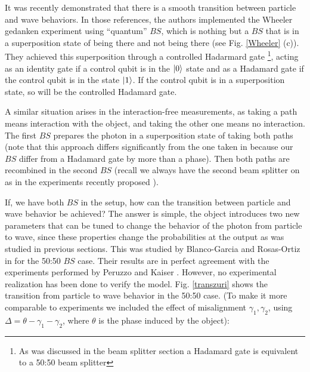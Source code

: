 \documentclass[12pt]{book}
\begin{document}
It was recently demonstrated \cite{Peruzzo, Kaiser2012} that there is a smooth transition between particle and wave behaviors. In those references, the authors implemented the Wheeler gedanken experiment using ``quantum'' $BS$, which is nothing but a $BS$ that is in a superposition state of being there and not being there (see Fig. \ref{Wheeler} (c)). They achieved this superposition through a controlled Hadarmard gate \footnote{As was discussed in the beam splitter section a Hadamard gate is equivalent to a 50:50 beam splitter}, acting as an identity gate if a control qubit is in the $\ket{0}$ state and as a Hadamard gate if the control qubit is in the state $\ket{1}$.  If the control qubit is in a superposition state, so will be the controlled Hadamard gate.




A similar situation arises in the interaction-free measurements, as taking a path means interaction with the object, and taking the other one means no interaction. The first $BS$ prepares the photon in a superposition state of taking both paths (note that this approach differs significantly from the one taken in \cite{Peruzzo,Kaiser2012} because our $BS$ differ from a Hadamard gate by more than a phase). Then both paths are recombined in the second $BS$ (recall we always have the second beam splitter on as in the experiments recently proposed \cite{Polino}).


If, we have both $BS$ in the setup, how can the transition between particle and wave behavior be achieved? The answer is simple, the object introduces two new parameters that can be tuned to change the behavior of the photon from particle to wave, since these properties change the probabilities at the output as was studied in previous sections. This was studied by Blanco-Garcia and  Rosas-Ortiz in \cite{azuri} for the 50:50 $BS$ case. Their results are in perfect agreement with the experiments performed by Peruzzo \cite{Peruzzo} and Kaiser \cite{Kaiser2012}. However, no experimental realization has been done to verify the model. Fig. \ref{transzuri} shows the transition from particle to wave behavior in the 50:50 case. (To make it more comparable to experiments we included the effect of misalignment $\gamma_{1},\gamma_{2}$, using $\Delta=\theta-\gamma_{1}-\gamma_{2}$, where $\theta$ is the phase induced by the object):
\end{document}
